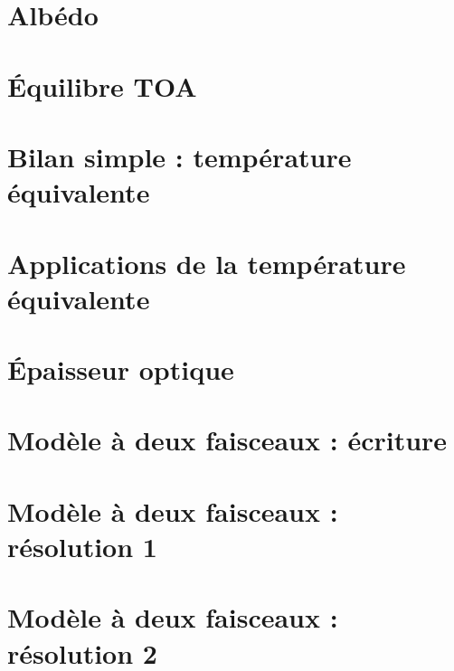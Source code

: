 \documentclass[a4paper,DIV16,10pt]{scrartcl}
\begin{document}
\newpage 
\section{Albédo} 


\newpage
\section{\'Equilibre TOA}


\newpage
\section{Bilan simple : température équivalente}


\newpage
\section{Applications de la température équivalente}


\newpage
\section{\'Epaisseur optique}


\newpage
\section{Modèle à deux faisceaux : écriture}


\newpage
\section{Modèle à deux faisceaux : résolution 1}


\newpage
\section{Modèle à deux faisceaux : résolution 2}


%
\end{document}
